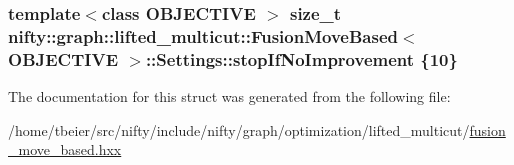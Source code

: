 \subsubsection[{stop\+If\+No\+Improvement}]{\setlength{\rightskip}{0pt plus 5cm}template$<$class O\+B\+J\+E\+C\+T\+I\+V\+E $>$ size\+\_\+t {\bf nifty\+::graph\+::lifted\+\_\+multicut\+::\+Fusion\+Move\+Based}$<$ O\+B\+J\+E\+C\+T\+I\+V\+E $>$\+::Settings\+::stop\+If\+No\+Improvement \{10\}}\label{structnifty_1_1graph_1_1lifted__multicut_1_1FusionMoveBased_1_1Settings_a55f977ae0db0c81f48cb547dbe998ea9}


The documentation for this struct was generated from the following file\+:\begin{DoxyCompactItemize}
\item 
/home/tbeier/src/nifty/include/nifty/graph/optimization/lifted\+\_\+multicut/\hyperlink{lifted__multicut_2fusion__move__based_8hxx}{fusion\+\_\+move\+\_\+based.\+hxx}\end{DoxyCompactItemize}
